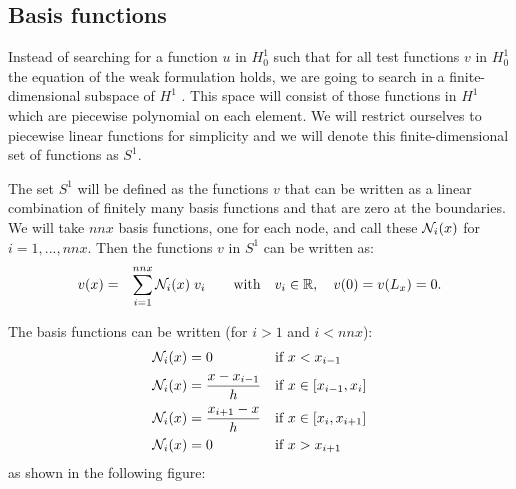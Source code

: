 \subsection{Basis functions}


Instead of searching for a function $u$ in $H_0^1$ such that for all test functions 
$v$ in $H_0^1$ the equation of the weak formulation holds, 
we are going to search in a finite-dimensional subspace of $H^1$ . This space will consist
of those functions in $H^1$ which are piecewise polynomial on each element. 
We will restrict ourselves to piecewise linear functions for simplicity and 
we will denote this finite-dimensional set of functions as $S^1$.


The set $S^1$ will be defined as the functions $v$ that can be written as a linear 
combination of finitely many basis functions and that are zero at the boundaries. 
We will take $nnx$ basis functions, one for each node,
and call these ${\mathcal{N}}_i(x)$ for $i=1, ..., nnx$. 
Then the functions $v$ in $S^1$ can be written as:
\begin{eqnarray}
v(x) &=& \sum_{i=1}^{nnx} {\mathcal{N}}_i(x) \; v_i \qquad \text{with} \quad v_i \in {\mathbb{R}}, \quad v(0)=v(L_x)=0.
\end{eqnarray}

The basis functions can be written (for $i>1$ and $i<nnx$):
\begin{align}
{\mathcal{N}}_i(x) &= 0 & \text{if } &x < x_{i-1} \nonumber\\
{\mathcal{N}}_i(x) &=  \frac{x-x_{i-1}}{h}& \text{if } & x\in [x_{i-1},x_{i}] \nonumber\\
{\mathcal{N}}_i(x) &=  \frac{x_{i+1}-x}{h}   & \text{if } &x \in [x_{i},x_{i+1}] \nonumber\\
{\mathcal{N}}_i(x) &= 0 & \text{if } &x >x_{i+1} \nonumber
\end{align}
as shown in the following figure:
\begin{center}
\end{center}

